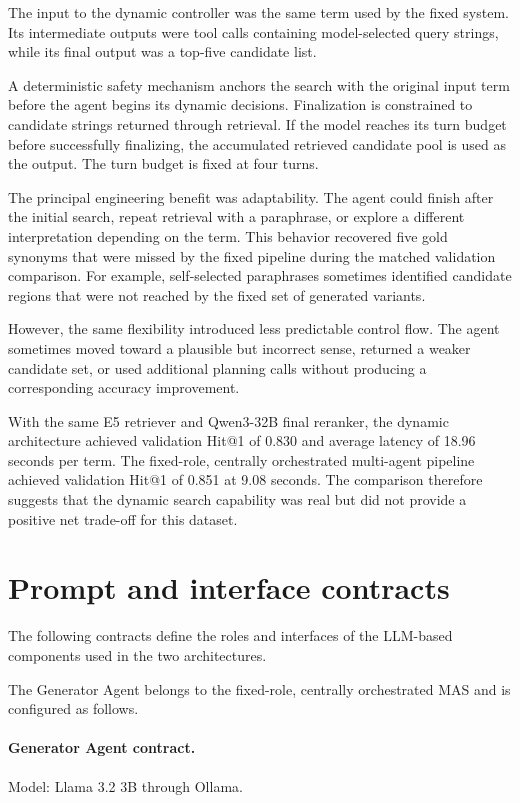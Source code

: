 The input to the dynamic controller was the same term used by the fixed system. Its intermediate outputs were tool calls containing model-selected query strings, while its final output was a top-five candidate list.

A deterministic safety mechanism anchors the search with the original input term before the agent begins its dynamic decisions. Finalization is constrained to candidate strings returned through retrieval. If the model reaches its turn budget before successfully finalizing, the accumulated retrieved candidate pool is used as the output. The turn budget is fixed at four turns.

The principal engineering benefit was adaptability. The agent could finish after the initial search, repeat retrieval with a paraphrase, or explore a different interpretation depending on the term. This behavior recovered five gold synonyms that were missed by the fixed pipeline during the matched validation comparison. For example, self-selected paraphrases sometimes identified candidate regions that were not reached by the fixed set of generated variants.

However, the same flexibility introduced less predictable control flow. The agent sometimes moved toward a plausible but incorrect sense, returned a weaker candidate set, or used additional planning calls without producing a corresponding accuracy improvement.

With the same E5 retriever and Qwen3-32B final reranker, the dynamic architecture achieved validation Hit@1 of 0.830 and average latency of 18.96 seconds per term. The fixed-role, centrally orchestrated multi-agent pipeline achieved validation Hit@1 of 0.851 at 9.08 seconds. The comparison therefore suggests that the dynamic search capability was real but did not provide a positive net trade-off for this dataset.

\section{Prompt and interface contracts}

The following contracts define the roles and interfaces of the LLM-based components used in the two architectures.

The Generator Agent belongs to the fixed-role, centrally orchestrated MAS and is configured as follows.

\paragraph{Generator Agent contract.}
Model: Llama 3.2 3B through Ollama.

